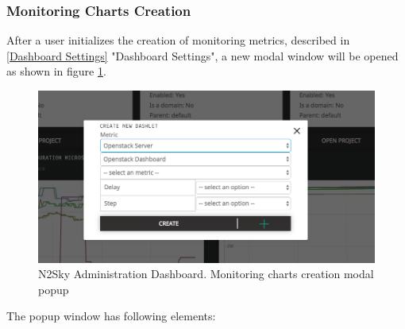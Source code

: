 \subsubsection{Monitoring Charts Creation}\label{Monitoring charts creation}

After a user initializes the creation of monitoring metrics, described in \autoref{Dashboard Settings} "Dashboard Settings", a new modal window will be opened as shown in figure \ref{fig:create_monitoring}.

\begin{figure}[H]
\begin{center}
  \includegraphics[width=\linewidth]{components/4/pics/create_monitoring.png}
  \caption{N2Sky Administration Dashboard. Monitoring charts creation modal popup}
  \label{fig:create_monitoring}
\end{center}
\end{figure}

The popup window has following elements:

